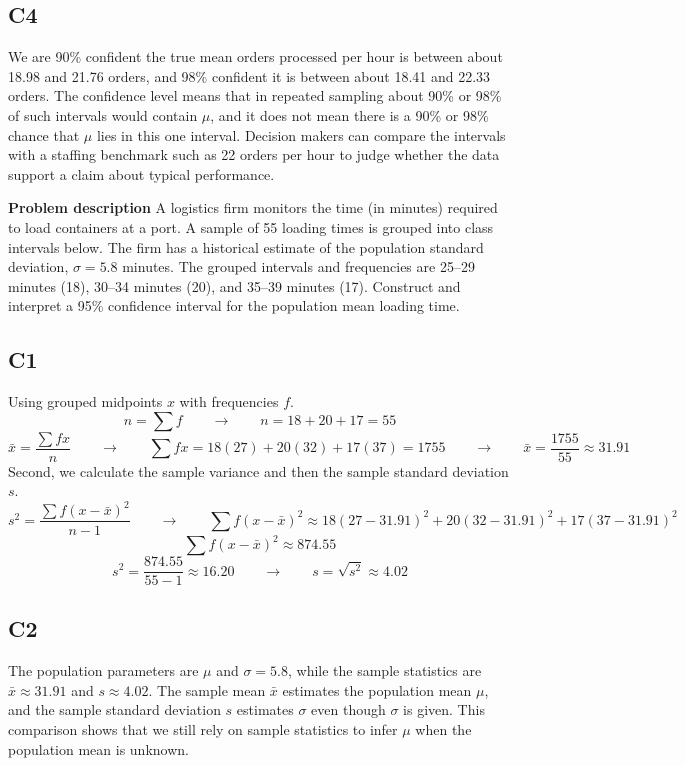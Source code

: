 \begin{ExamProblems}
		\subsection*{C4}
		We are 90\% confident the true mean orders processed per hour is between about 18.98 and 21.76 orders, and 98\% confident it is between about 18.41 and 22.33 orders. The confidence level means that in repeated sampling about 90\% or 98\% of such intervals would contain $\mu$, and it does not mean there is a 90\% or 98\% chance that $\mu$ lies in this one interval. Decision makers can compare the intervals with a staffing benchmark such as 22 orders per hour to judge whether the data support a claim about typical performance.

		\newpage
		\item
		\textbf{Problem description}
		A logistics firm monitors the time (in minutes) required to load containers at a port.
		A sample of 55 loading times is grouped into class intervals below. The firm has a historical estimate of the population standard deviation, \(\sigma = 5.8\) minutes.
		The grouped intervals and frequencies are 25--29 minutes (18), 30--34 minutes (20), and 35--39 minutes (17).
		Construct and interpret a 95\% confidence interval for the population mean loading time.

		\subsection*{C1}
		Using grouped midpoints $x$ with frequencies $f$.
		\[
		n = \sum f \qquad \longrightarrow \qquad n = 18 + 20 + 17 = 55
		\]
		\[
		\bar{x} = \frac{\sum f x}{n} \qquad \longrightarrow \qquad \sum f x = 18(27) + 20(32) + 17(37) = 1755 \qquad \longrightarrow \qquad \bar{x} = \frac{1755}{55} \approx 31.91
		\]
		Second, we calculate the sample variance and then the sample standard deviation $s$.
		\[
		s^2 = \frac{\sum f(x-\bar{x})^2}{n-1} \qquad \longrightarrow \qquad \sum f(x-\bar{x})^2 \approx 18(27-31.91)^2 + 20(32-31.91)^2 + 17(37-31.91)^2
		\]
		\[
		\sum f(x-\bar{x})^2 \approx 874.55
		\]
		\[
		s^2 = \frac{874.55}{55-1} \approx 16.20  \qquad \longrightarrow \qquad s = \sqrt{s^2} \approx 4.02
		\]
		\subsection*{C2}
		The population parameters are $\mu$ and $\sigma = 5.8$, while the sample statistics are $\bar{x} \approx 31.91$ and $s \approx 4.02$. The sample mean $\bar{x}$ estimates the population mean $\mu$, and the sample standard deviation $s$ estimates $\sigma$ even though $\sigma$ is given. This comparison shows that we still rely on sample statistics to infer $\mu$ when the population mean is unknown.


\end{ExamProblems}
